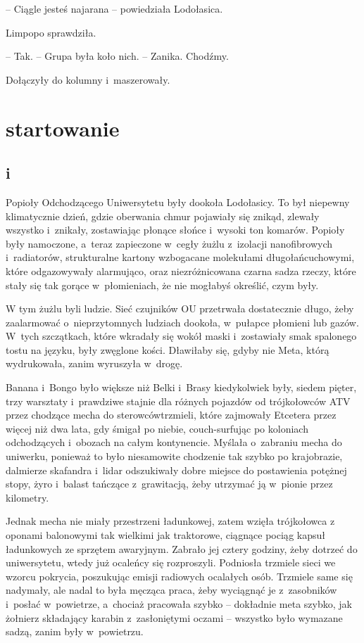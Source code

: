 \documentclass[oneside,polish,11pt,sfheadings]{mwbk}
\begin{document}
-- Ciągle jesteś najarana -- powiedziała Lodołasica.

Limpopo sprawdziła. 

-- Tak. -- Grupa była koło nich. -- Zanika. Chodźmy.

Dołączyły do kolumny i~maszerowały.


\part{startowanie}

\chapter*{i}

Popioły Odchodzącego Uniwersytetu były dookoła Lodołasicy. To był
niepewny klimatycznie dzień, gdzie oberwania chmur pojawiały się znikąd,
zlewały wszystko i~znikały, zostawiając płonące słońce i~wysoki ton
komarów. Popioły były namoczone, a~teraz zapieczone w~cegły żużlu z~izolacji nanofibrowych i~radiatorów, strukturalne kartony wzbogacane
molekułami długołańcuchowymi, które odgazowywały alarmująco, oraz
niezróżnicowana czarna sadza rzeczy, które stały się tak gorące w~płomieniach, że nie mogłabyś określić, czym były.

W tym żużlu byli ludzie. Sieć czujników OU przetrwała dostatecznie
długo, żeby zaalarmować o~nieprzytomnych ludziach dookoła, w~pułapce
płomieni lub gazów. W~tych szczątkach, które wkradały się wokół maski i~zostawiały smak spalonego tostu na języku, były zwęglone kości.
Dławiłaby się, gdyby nie Meta, którą wydrukowała, zanim wyruszyła w~drogę.

Banana i~Bongo było większe niż Belki i~Brasy kiedykolwiek były, siedem
pięter, trzy warsztaty i~prawdziwe stajnie dla różnych pojazdów od
trójkołowców ATV przez chodzące mecha do sterowców\dywiz trzmieli, które
zajmowały Etcetera przez więcej niż dwa lata, gdy śmigał po niebie,
couch-surfując po koloniach odchodzących i~obozach na całym kontynencie.
Myślała o~zabraniu mecha do uniwerku, ponieważ to było niesamowite
chodzenie tak szybko po krajobrazie, dalmierze skafandra i~lidar
odszukiwały dobre miejsce do postawienia potężnej stopy, żyro i~balast
tańczące z~grawitacją, żeby utrzymać ją w~pionie przez kilometry.

Jednak mecha nie miały przestrzeni ładunkowej, zatem wzięła trójkołowca
z oponami balonowymi tak wielkimi jak traktorowe, ciągnące pociąg kapsuł
ładunkowych ze sprzętem awaryjnym. Zabrało jej cztery godziny, żeby
dotrzeć do uniwersytetu, wtedy już ocaleńcy się rozproszyli. Podniosła
trzmiele sieci we wzorcu pokrycia, poszukując emisji radiowych ocalałych
osób. Trzmiele same się nadymały, ale nadal to była męcząca praca, żeby
wyciągnąć je z~zasobników i~posłać w~powietrze, a~chociaż pracowała
szybko -- dokładnie meta szybko, jak żołnierz składający karabin z~zasłoniętymi oczami -- wszystko było wymazane sadzą, zanim były w~powietrzu.
\end{document}
